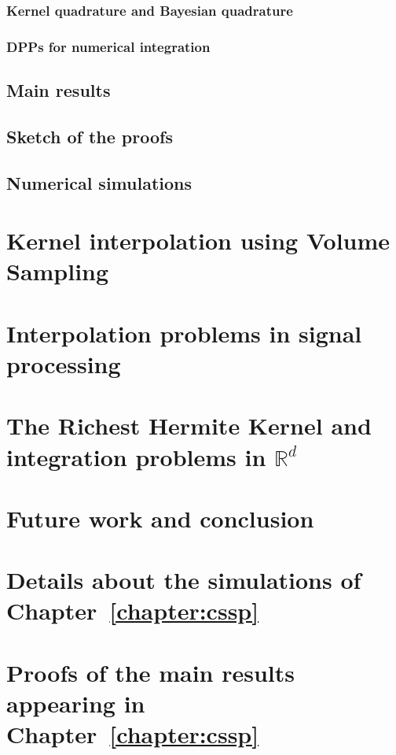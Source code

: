 \documentclass[twoside,11pt]{article}
\begin{document}
\subsubsection{Kernel quadrature and Bayesian quadrature}

\subsubsection{DPPs for numerical integration}

\subsection{Main results}

\subsection{Sketch of the proofs}

\subsection{Numerical simulations}

\section{Kernel interpolation using Volume Sampling}

\section{Interpolation problems in signal processing}

\section{The Richest Hermite Kernel and integration problems in $\mathbb{R}^{d}$}

\section{Future work and conclusion}



\appendix

\section{Details about the simulations of Chapter~\ref{chapter:cssp} }
\section{Proofs of the main results appearing in Chapter~\ref{chapter:cssp} }

\end{document}
